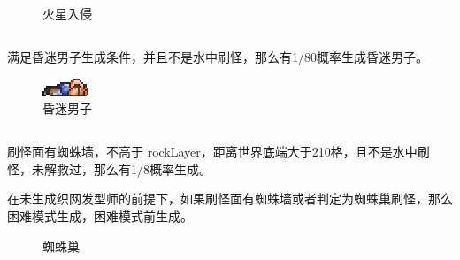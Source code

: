 \begin{figure}[h]
    \caption{火星入侵}
\end{figure}

\subsection{}
满足昏迷男子生成条件，并且不是水中刷怪，那么有1/80概率生成昏迷男子。
\begin{figure}[h]
    \centering
    \includegraphics{npcs/Unconscious_Man.png}
    \caption{昏迷男子}
\end{figure}

\subsection{}
刷怪面有蜘蛛墙，不高于 rockLayer，距离世界底端大于210格，且不是水中刷怪，未解救过，那么有1/8概率生成。

在未生成织网发型师的前提下，如果刷怪面有蜘蛛墙或者判定为蜘蛛巢刷怪，那么困难模式生成，困难模式前生成。
\begin{figure}[h]
    \centering
    \caption{蜘蛛巢}
\end{figure}

